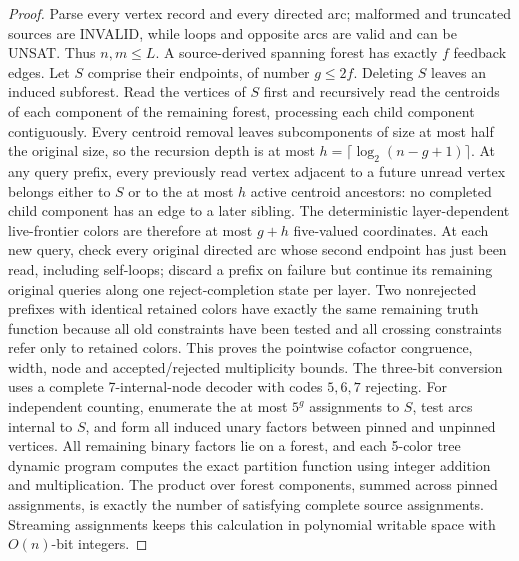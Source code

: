 \documentclass[11pt]{article}
\begin{document}
\begin{proof}
Parse every vertex record and every directed arc; malformed and
truncated sources are INVALID, while loops and opposite arcs
are valid and can be UNSAT. Thus $n,m\le L$.
A source-derived spanning forest has exactly $f$ feedback edges.
Let $S$ comprise their endpoints, of number $g\le 2f$.
Deleting $S$ leaves an induced subforest. Read the vertices of
$S$ first and recursively read the centroids of each component of
the remaining forest, processing each child component contiguously.
Every centroid removal leaves subcomponents of size at most half
the original size, so the recursion depth is at most
$h=\lceil\log_2(n-g+1)\rceil$. At any query prefix, every
previously read vertex adjacent to a future unread vertex belongs
either to $S$ or to the at most $h$ active centroid ancestors:
no completed child component has an edge to a later sibling.
The deterministic layer-dependent live-frontier colors are therefore
at most $g+h$ five-valued coordinates.
At each new query, check every original directed arc whose second
endpoint has just been read, including self-loops; discard a prefix
on failure but continue its remaining original queries along one
reject-completion state per layer. Two nonrejected prefixes with
identical retained colors have exactly the same remaining truth
function because all old constraints have been tested and all
crossing constraints refer only to retained colors. This proves
the pointwise cofactor congruence, width, node and accepted/rejected
multiplicity bounds. The three-bit conversion uses a complete
7-internal-node decoder with codes $5,6,7$ rejecting.
For independent counting, enumerate the at most $5^g$ assignments
to $S$, test arcs internal to $S$, and form all induced unary factors
between pinned and unpinned vertices. All remaining binary factors
lie on a forest, and each 5-color tree dynamic program computes
the exact partition function using integer addition and
multiplication. The product over forest components, summed across
pinned assignments, is exactly the number of satisfying complete
source assignments. Streaming assignments keeps this calculation
in polynomial writable space with $O(n)$-bit integers.
\end{proof}
\end{document}
